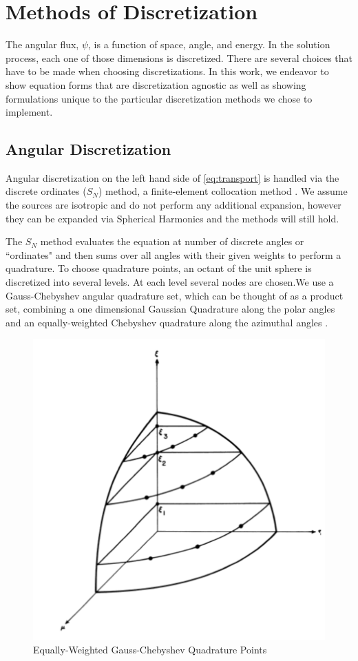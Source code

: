 \section{Methods of Discretization}
The angular flux, $\psi$, is a function of space, angle, and energy. In the solution process, each one of those dimensions is discretized. There are several choices that have to be made when choosing discretizations. In this work, we endeavor to show equation forms that are discretization agnostic as well as showing formulations unique to the particular discretization methods we chose to implement. 

\subsection{Angular Discretization}

Angular discretization on the left hand side of \eqref{eq:transport} is handled via the discrete ordinates ($S_N$) method, a finite-element collocation method \cite{Lathrop1965}. We assume the sources are isotropic and do not perform any additional expansion, however they can be expanded via Spherical Harmonics and the methods will still hold. 

The $S_N$ method evaluates the equation at number of discrete angles or ``ordinates" and then sums over all angles with their given weights to perform a quadrature. To choose quadrature points, an octant of the unit sphere is discretized into several levels. At each level several nodes are chosen.We use a Gauss-Chebyshev angular quadrature set, which can be thought of as a product set, combining a one dimensional Gaussian Quadrature along the polar angles and an equally-weighted Chebyshev quadrature along the azimuthal angles \cite{jarrel-thesis}.

\begin{figure}
    \centering
    \includegraphics[width=.5\textwidth]{fig/SNPoints.png}
    \caption{Equally-Weighted Gauss-Chebyshev Quadrature Points \cite{Lathrop1965}}
    \label{fig:SN}
\end{figure}


